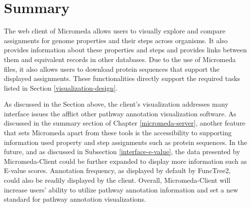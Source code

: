 \section{Summary} \label{micromeda-client-summary}

The web client of Micromeda allows users to visually explore and compare 
assignments for genome properties and their steps across organisms. It also 
provides information about these properties and steps and provides links between 
them and equivalent records in other databases. Due to the use of Micromeda 
files, it also allows users to download protein sequences that support the 
displayed assignments. These functionalities directly support the required tasks 
listed in Section \ref{visualization-design}.

As discussed in the Section above, the client's visualization addresses many 
interface issues the afflict other pathway annotation visualization software. As 
discussed in the summary section of Chapter \ref{micromeda-server}, another 
feature that sets Micromeda apart from these tools is the accessibility to 
supporting information used property and step assignments such as protein 
sequences. In the future, and as discussed in Subsection 
\ref{interface-e-value}, the data presented by Micromeda-Client could be further 
expanded to display more information such as E-value scores. Annotation 
frequency, as displayed by default by FuncTree2, could also be readily displayed 
by the client. Overall, Micromeda-Client will increase users' ability to utilize 
pathway annotation information and set a new standard for pathway annotation 
visualizations.
